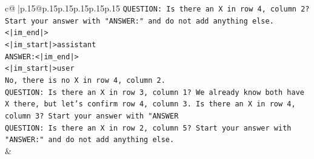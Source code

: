 \documentclass{article}
\begin{document}
{\begin{supertabular}{c@{$\;$}|p{.15\linewidth}@{}p{.15\linewidth}p{.15\linewidth}p{.15\linewidth}p{.15\linewidth}p{.15\linewidth}}
{{{\texttt{QUESTION: Is there an X in row 4, column 2? Start your answer with "ANSWER:" and do not add anything else.<|im\_end|>} \\
\texttt{<|im\_start|>assistant} \\
\texttt{ANSWER:<|im\_end|>} \\
\texttt{<|im\_start|>user} \\
\texttt{No, there is no X in row 4, column 2.} \\
\texttt{QUESTION: Is there an X in row 3, column 1? We already know both have X there, but let's confirm row 4, column 3. Is there an X in row 4, column 3? Start your answer with "ANSWER} \\
\texttt{QUESTION: Is there an X in row 2, column 5? Start your answer with "ANSWER:" and do not add anything else.} \\
            }
        }
    }
    & \\ \\


\end{supertabular}}
\end{document}
